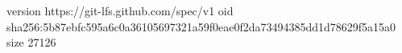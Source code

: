 version https://git-lfs.github.com/spec/v1
oid sha256:5b87ebfc595a6c0a36105697321a59f0eae0f2da73494385dd1d78629f5a15a0
size 27126
